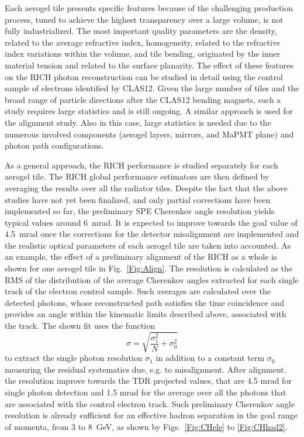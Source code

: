 \documentclass[5p,times,twocolumn]{elsarticle}
\begin{document}
Each aerogel tile presents specific features because of the challenging production process, tuned to achieve the
highest transparency over a large volume, is not fully industrialized. The most important quality parameters are the
density, related to the average refractive index, homogeneity, related to the refractive index variations within the
volume, and tile bending, originated by the inner material tension and related to the surface planarity. The effect of
these features on the RICH photon reconstruction can be studied in detail using the control sample of electrons
identified by CLAS12. Given the large number of tiles and the broad range of particle directions after the CLAS12
bending magnets, such a study requires large statistics and is still ongoing. A similar approach is used for the
alignment study. Also in this case, large statistics is needed due to the numerous involved components (aerogel
layers, mirrors, and MaPMT plane) and photon path configurations. 

As a general approach, the RICH performance is studied separately for each aerogel tile.
The RICH global performance estimators are then defined by averaging the results over all the
radiator tiles. 
Despite the fact that the above studies have not yet been finalized, and only partial corrections have been
implemented so far, the preliminary SPE Cherenkov angle resolution yields typical values around 6~mrad. It is expected to improve
towards the goal value of 4.5~mrad once the corrections for the detector misalignment are implemented and the
realistic optical parameters of each aerogel tile are taken into accounted. As an example, the effect of a preliminary
alignment of the RICH as a whole is shown for one aerogel tile in Fig.~\ref{Fig:Align}. The
resolution is calculated as the RMS of the distribution of the average Cherenkov angles extracted for 
each single track of the electron control sample. Such averages are calculated 
over the detected photons, whose reconstructed path satisfies the time coincidence and provides an angle within the 
kinematic limits described above, associated with the track. The shown fit uses the function
$$\sigma = \sqrt{\frac{\sigma_1^2}{N}+\sigma_0^2}$$ to extract the single photon resolution $\sigma_1$ in addition to
a constant term $\sigma_0$ measuring the residual systematics due, e.g. to misalignment.
After alignment, the resolution improve towards
the TDR projected values, that are 4.5 mrad for single photon detection and 1.5 mrad for the average over all the photons 
that are associated with the control electron track. Such preliminary Cherenkov angle resolution is already sufficient for an effective hadron
separation in the goal range of momenta, from 3 to 8~GeV, as shown by Figs.~\ref{Fig:CHele} to \ref{Fig:CHhad2}.
\end{document}
